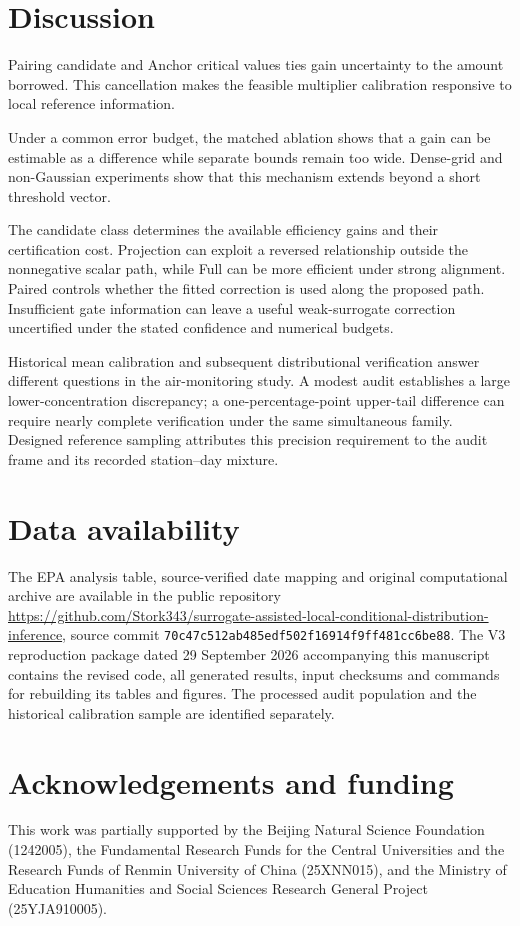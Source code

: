 \section{Discussion}
Pairing candidate and Anchor critical values ties gain uncertainty to the amount borrowed.
This cancellation makes the feasible multiplier calibration responsive to local reference information.

Under a common error budget, the matched ablation shows that a gain can be estimable as a difference while separate bounds remain too wide.
Dense-grid and non-Gaussian experiments show that this mechanism extends beyond a short threshold vector.

The candidate class determines the available efficiency gains and their certification cost.
Projection can exploit a reversed relationship outside the nonnegative scalar path, while Full can be more efficient under strong alignment.
Paired controls whether the fitted correction is used along the proposed path.
Insufficient gate information can leave a useful weak-surrogate correction uncertified under the stated confidence and numerical budgets.

Historical mean calibration and subsequent distributional verification answer different questions in the air-monitoring study.
A modest audit establishes a large lower-concentration discrepancy; a one-percentage-point upper-tail difference can require nearly complete verification under the same simultaneous family.
Designed reference sampling attributes this precision requirement to the audit frame and its recorded station--day mixture.

\section*{Data availability}
The EPA analysis table, source-verified date mapping and original computational archive are available in the public repository \url{https://github.com/Stork343/surrogate-assisted-local-conditional-distribution-inference}, source commit \texttt{70c47c512ab485edf502f16914f9ff481cc6be88}. The V3 reproduction package dated 29 September 2026 accompanying this manuscript contains the revised code, all generated results, input checksums and commands for rebuilding its tables and figures. The processed audit population and the historical calibration sample are identified separately.

\section*{Acknowledgements and funding}
This work was partially supported by the Beijing Natural Science Foundation (1242005), the Fundamental Research Funds for the Central Universities and the Research Funds of Renmin University of China (25XNN015), and the Ministry of Education Humanities and Social Sciences Research General Project (25YJA910005).

